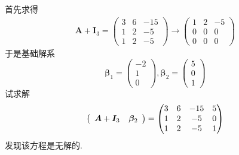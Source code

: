 {\begin{solution}
        首先求得\begin{align*}
            \bm{A}+\bm{I}_3=\begin{pmatrix}
                                3 & 6 & -15 \\1&2&-5\\1 & 2 & -5
                            \end{pmatrix}\longrightarrow\begin{pmatrix}
                                                            1 & 2 & -5 \\0&0&0\\0 & 0 & 0
                                                        \end{pmatrix}
        \end{align*}于是基础解系\[
            \bm{\beta}_1=\begin{pmatrix}
                -2 \\1\\0
            \end{pmatrix},\bm{\beta}_2=\begin{pmatrix}
                5 \\0\\1
            \end{pmatrix}
        \]试求解\[
            \left(
            \begin{array}{c:c}
                    \bm{A}+\bm{I}_3 & \bm{\beta}_2
                \end{array}
            \right)=\begin{pmatrix}
                3 & 6 & -15 & 5 \\1&2&-5&0\\1 & 2 & -5 & 1
            \end{pmatrix}
        \]发现该方程是无解的.


\end{solution}}

